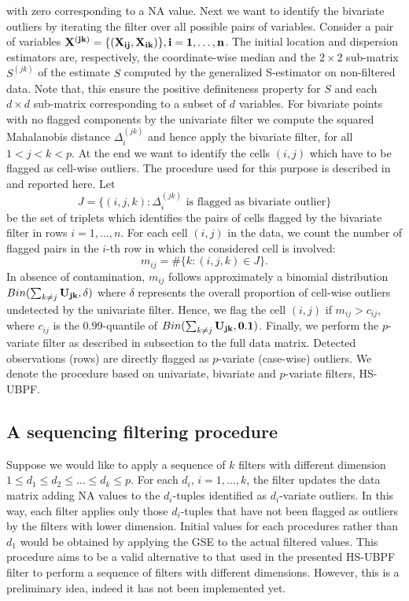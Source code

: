 \documentclass[a4paper,12pt]{article}
\begin{document}
with zero corresponding to a NA value. Next we want to identify the bivariate outliers by iterating the filter over all possible pairs of variables. Consider a pair of variables $\bf{X}^{(jk)} = \{ (X_{ij},X_{ik}) \}, i = 1, \ldots, n$. The initial location and dispersion estimators are, respectively, the coordinate-wise median and the $2 \times 2$ sub-matrix $S^{(jk)}$ of the estimate $S$ computed by the generalized S-estimator on non-filtered data. Note that, this ensure the positive definiteness property for $S$ and each $d \times d$ sub-matrix corresponding to a subset of $d$ variables. For bivariate points with no flagged components by the univariate filter we compute the squared Mahalanobis distance $\Delta^{(jk)}_i$ and hence apply the bivariate filter, for all $1 < j < k < p$. At the end we want to identify the cells $(i,j)$ which have to be flagged as cell-wise outliers. The procedure used for this purpose is described in \citet{Zamar2017} and reported here. Let
\begin{equation*}
J = \{ (i,j,k) : \Delta_i^{(jk)} \mbox{ is flagged as bivariate outlier} \}
\end{equation*}
be the set of triplets which identifies the pairs of cells flagged by the bivariate filter in rows $i = 1, \ldots, n$. For each cell $(i,j)$ in the data, we count the number of flagged pairs in the $i$-th row in which the considered cell is involved:
\begin{equation*}
m_{ij} = \#\{ k : (i,j,k) \in J\}.
\end{equation*}
In absence of contamination, $m_{ij}$ follows approximately a binomial distribution $Bin(\sum_{k \not = j}\bf{U}_{jk},\delta)$ where $\delta$ represents the overall proportion of cell-wise outliers undetected by the univariate filter. Hence, we flag the cell $(i,j)$ if $m_{ij} > c_{ij}$, where $c_{ij}$ is the $0.99$-quantile of $Bin(\sum_{k \not = j}\bf{U}_{jk},0.1)$.
Finally, we perform the $p$-variate filter as described in subsection  to the full data matrix. Detected observations (rows) are directly flagged as $p$-variate (case-wise) outliers. We denote the procedure based on univariate, bivariate and $p$-variate filters, HS-UBPF.
\subsection{A  sequencing filtering procedure}
Suppose we would like to apply a sequence of $k$ filters with different dimension $1 \le d_1 \le d_2 \le \ldots \le d_k \le p$. For each $d_i$, $i = 1, \ldots, k$, the filter updates the data matrix adding NA values to the $d_i$-tuples identified as $d_i$-variate outliers. In this way, each filter applies only those $d_i$-tuples that have not been flagged as outliers by the filters with lower dimension.
Initial values for each procedures rather than $d_1$ would be obtained by applying the GSE to the actual filtered values.
This procedure aims to be a valid alternative to that used in the presented HS-UBPF filter to perform a sequence of filters with different dimensions. However, this is a preliminary idea, indeed it has not been implemented yet.
\end{document}
